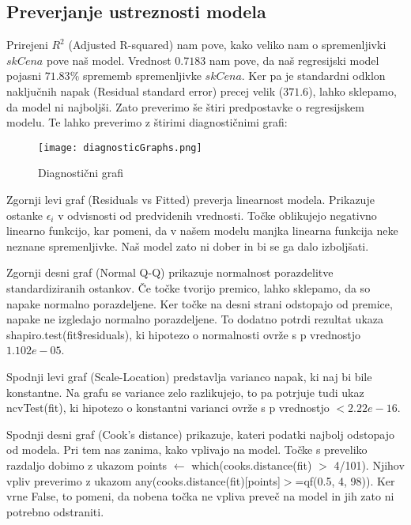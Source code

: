 \documentclass[a4paper, 12pt]{article}
\begin{document}
\subsection{Preverjanje ustreznosti modela}

Prirejeni $ R^{2} $ (Adjusted R-squared) nam pove, kako veliko nam o
spremenljivki $ skCena $ pove naš model. Vrednost $ 0.7183 $ nam pove, da naš
regresijski model pojasni $ 71.83\% $ sprememb spremenljivke $ skCena $. Ker pa
je standardni odklon naključnih napak (Residual standard error) precej velik
($ 371.6 $), lahko sklepamo, da model ni najboljši. Zato preverimo še štiri
predpostavke o regresijskem modelu. Te lahko preverimo z štirimi diagnostičnimi
grafi:
\begin{figure}[H]
	\centering
	\texttt{[image: diagnosticGraphs.png]}
	\caption{Diagnostični grafi}
\end{figure}

Zgornji levi graf (Residuals vs Fitted) preverja linearnost modela. Prikazuje
ostanke $ \epsilon_{i} $ v odvisnosti od predvidenih vrednosti. Točke
oblikujejo negativno linearno funkcijo, kar pomeni, da v našem modelu manjka
linearna funkcija neke neznane spremenljivke. Naš model zato ni dober in bi se
ga dalo izboljšati.

Zgornji desni graf (Normal Q-Q) prikazuje normalnost porazdelitve
standardiziranih ostankov. Če točke tvorijo premico, lahko sklepamo, da so
napake normalno porazdeljene. Ker točke na desni strani odstopajo od premice,
napake ne izgledajo normalno porazdeljene. To dodatno potrdi rezultat ukaza
{\sf shapiro.test(fit\$residuals)}, ki hipotezo o normalnosti ovrže s p
vrednostjo $ 1.102e-05 $.

Spodnji levi graf (Scale-Location) predstavlja varianco napak, ki naj bi bile
konstantne. Na grafu se variance zelo razlikujejo, to pa potrjuje tudi ukaz
{\sf ncvTest(fit)}, ki hipotezo o konstantni varianci ovrže s p vrednostjo
$ < 2.22e-16 $.

Spodnji desni graf (Cook's distance) prikazuje, kateri podatki najbolj
odstopajo od modela. Pri tem nas zanima, kako vplivajo na model. Točke s
preveliko razdaljo dobimo z ukazom {\sf points $\leftarrow$ which(cooks.distance(fit) $ > $ 4/101)}.
Njihov vpliv preverimo z ukazom {\sf any(cooks.distance(fit)[points]$ > $=qf(0.5, 4, 98))}.
Ker vrne False, to pomeni, da nobena točka ne vpliva preveč na model in jih
zato ni potrebno odstraniti.
\end{document}
